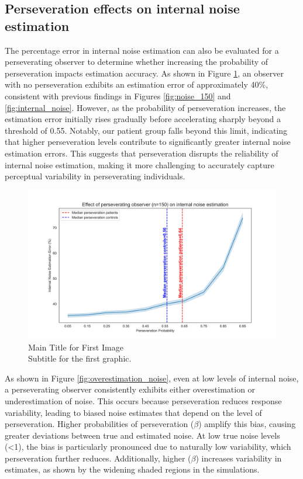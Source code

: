 \subsection{Perseveration effects on internal noise estimation}
The percentage error in internal noise estimation can also be evaluated for a perseverating observer to determine whether increasing the probability of perseveration impacts estimation accuracy. As shown in Figure \ref{fig:noise_perseverating_observer}, an observer with no perseveration exhibits an estimation error of approximately 40\%, consistent with previous findings in Figures \ref{fig:noise_150} and \ref{fig:internal_noise}. However, as the probability of perseveration increases, the estimation error initially rises gradually before accelerating sharply beyond a threshold of 0.55. Notably, our patient group falls beyond this limit, indicating that higher perseveration levels contribute to significantly greater internal noise estimation errors. This suggests that perseveration disrupts the reliability of internal noise estimation, making it more challenging to accurately capture perceptual variability in perseverating individuals.

\begin{figure}[H]
    \centering
    \includegraphics[width=15cm]{MainLayout/Images/chapter5/noise_perseverating_observer.jpg}
    \caption{Main Title for First Image \\ \small Subtitle for the first graphic.}
    \label{fig:noise_perseverating_observer}
\end{figure}

As shown in Figure \ref{fig:overestimation_noise}, even at low levels of internal noise, a perseverating observer consistently exhibits either overestimation or underestimation of noise. This occurs because perseveration reduces response variability, leading to biased noise estimates that depend on the level of perseveration. Higher probabilities of perseveration ($\beta$) amplify this bias, causing greater deviations between true and estimated noise. At low true noise levels (<1), the bias is particularly pronounced due to naturally low variability, which perseveration further reduces. Additionally, higher ($\beta$) increases variability in estimates, as shown by the widening shaded regions in the simulations.

